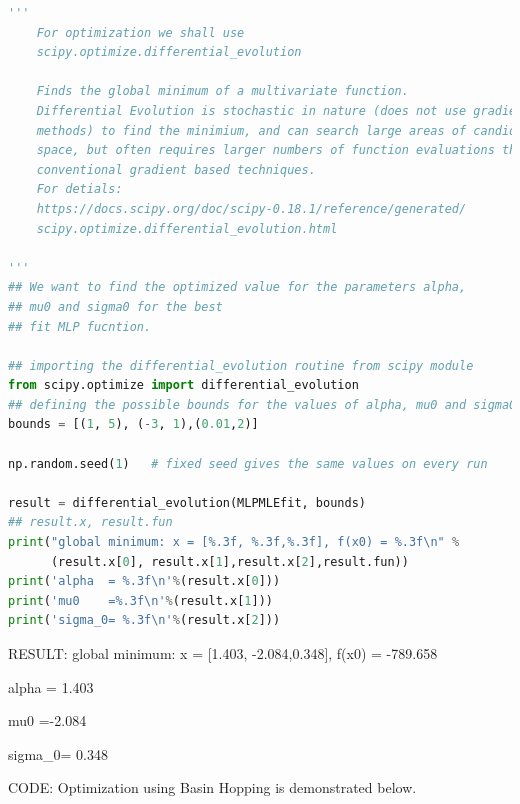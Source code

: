 \documentclass{article}
\begin{document}
\begin{lstlisting}[language=Python, caption=Python example]
'''
    For optimization we shall use
    scipy.optimize.differential_evolution

    Finds the global minimum of a multivariate function. 
    Differential Evolution is stochastic in nature (does not use gradient
    methods) to find the minimium, and can search large areas of candidate
    space, but often requires larger numbers of function evaluations than 
    conventional gradient based techniques.
    For detials: 
    https://docs.scipy.org/doc/scipy-0.18.1/reference/generated/
    scipy.optimize.differential_evolution.html

'''
## We want to find the optimized value for the parameters alpha,
## mu0 and sigma0 for the best
## fit MLP fucntion.

## importing the differential_evolution routine from scipy module
from scipy.optimize import differential_evolution
## defining the possible bounds for the values of alpha, mu0 and sigma0
bounds = [(1, 5), (-3, 1),(0.01,2)]

np.random.seed(1)   # fixed seed gives the same values on every run

result = differential_evolution(MLPMLEfit, bounds)
## result.x, result.fun
print("global minimum: x = [%.3f, %.3f,%.3f], f(x0) = %.3f\n" % 
      (result.x[0], result.x[1],result.x[2],result.fun))
print('alpha  = %.3f\n'%(result.x[0]))
print('mu0    =%.3f\n'%(result.x[1]))
print('sigma_0= %.3f\n'%(result.x[2]))
\end{lstlisting}

RESULT: global minimum: x = [1.403, -2.084,0.348], f(x0) = -789.658

alpha  = 1.403

mu0    =-2.084

sigma_0= 0.348

CODE: Optimization using Basin Hopping is demonstrated below. 
\end{document}
